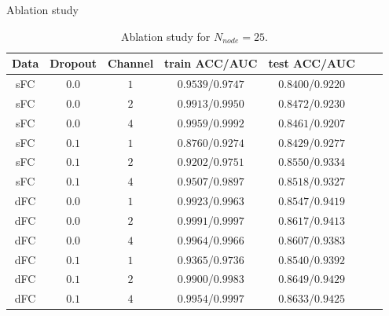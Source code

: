 \documentclass{beamer}
\begin{document}
\begin{frame}{Ablation study}

    \begin{table}[H]
        \centering
        \begin{tabular}{|c|c|c|c|c|c|c|}
            \hline
            Data & Dropout & Channel & train ACC/AUC     & test ACC/AUC      \\
            \hline
            sFC  & $0.0$   & $1$     & $0.9539$/$0.9747$ & $0.8400$/$0.9220$ \\
            \hline
            sFC  & $0.0$   & $2$     & $0.9913$/$0.9950$ & $0.8472$/$0.9230$ \\
            \hline
            sFC  & $0.0$   & $4$     & $0.9959$/$0.9992$ & $0.8461$/$0.9207$ \\
            \hline
            sFC  & $0.1$   & $1$     & $0.8760$/$0.9274$ & $0.8429$/$0.9277$ \\
            \hline
            sFC  & $0.1$   & $2$     & $0.9202$/$0.9751$ & $0.8550$/$0.9334$ \\
            \hline
            sFC  & $0.1$   & $4$     & $0.9507$/$0.9897$ & $0.8518$/$0.9327$ \\
            \hline
            dFC  & $0.0$   & $1$     & $0.9923$/$0.9963$ & $0.8547$/$0.9419$ \\
            \hline
            dFC  & $0.0$   & $2$     & $0.9991$/$0.9997$ & $0.8617$/$0.9413$ \\
            \hline
            dFC  & $0.0$   & $4$     & $0.9964$/$0.9966$ & $0.8607$/$0.9383$ \\
            \hline
            dFC  & $0.1$   & $1$     & $0.9365$/$0.9736$ & $0.8540$/$0.9392$ \\
            \hline
            dFC  & $0.1$   & $2$     & $0.9900$/$0.9983$ & $0.8649$/$0.9429$ \\
            \hline
            dFC  & $0.1$   & $4$     & $0.9954$/$0.9997$ & $0.8633$/$0.9425$ \\
            \hline
        \end{tabular}
        \caption{Ablation study for $N_{node} = 25$.}
    \end{table}

\end{frame}
\end{document}
